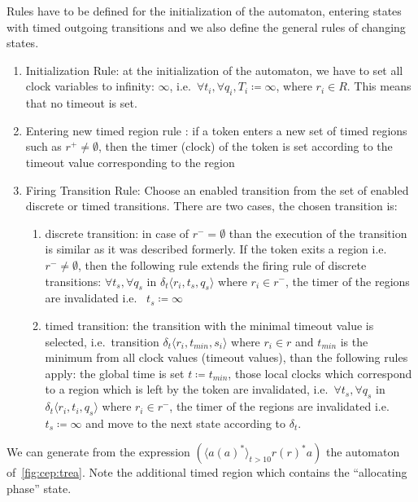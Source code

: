 Rules have to be defined for the initialization of the automaton, entering states with timed outgoing transitions and we also define the general rules of changing states. 
			
\begin{enumerate}
	\item Initialization Rule: at the initialization  of the automaton, we have to set all clock variables to infinity: $\infty$, i.e.~$\forall t_i, \forall q_i, T_i \coloneqq \infty $, where $r_i \in R$. This means that no timeout is set.
				
	\item Entering new timed region rule : if a token enters a new set of timed regions such as $r^+ \neq \emptyset$, then the timer (clock) of the token is set according to the timeout value corresponding to the region%
	\item Firing Transition Rule: Choose an enabled transition from the set of enabled discrete or timed transitions. There are two cases, the chosen transition is:
	\begin{enumerate}
		\item discrete transition: in case of $r^- = \emptyset$ than the execution of the transition is similar as it was described formerly. If the token exits a region i.e.~$r^- \neq \emptyset$, then the following rule extends the firing rule of discrete transitions: $\forall t_s, \forall q_s$ in $ \delta_t \langle r_i, t_s, q_s \rangle$ where $r_i \in r^-$, the timer of the regions are invalidated i.e.~	$t_s \coloneqq \infty$
		\item timed transition: the transition with the minimal timeout value is selected, i.e.~transition $\delta_t \langle r_i, t_{\mathit{min}}, s_i \rangle$ where $ r_i \in r$ and $t_{\mathit{min}}$ is the minimum from all clock values (timeout values), than the following rules apply:
					the global time is set $t \coloneqq t_{\textit{min}}$, those local clocks which correspond to a region which is left by the token are invalidated, i.e.~$\forall t_s, \forall q_s$ in $ \delta_t \langle r_i, t_i, q_s \rangle$ where $r_i \in r^-$, the timer of the regions are invalidated i.e.~$t_s \coloneqq \infty$ and move to the next state according to $\delta_t$.
	\end{enumerate}			
\end{enumerate}
			
			
We can generate from the expression %
$(\langle a (a)^\ast \rangle_{t > 10} r (r)^\ast a)$ the automaton of~\cref{fig:cep:trea}.
Note the additional timed region which contains the ``allocating phase'' state.
			
